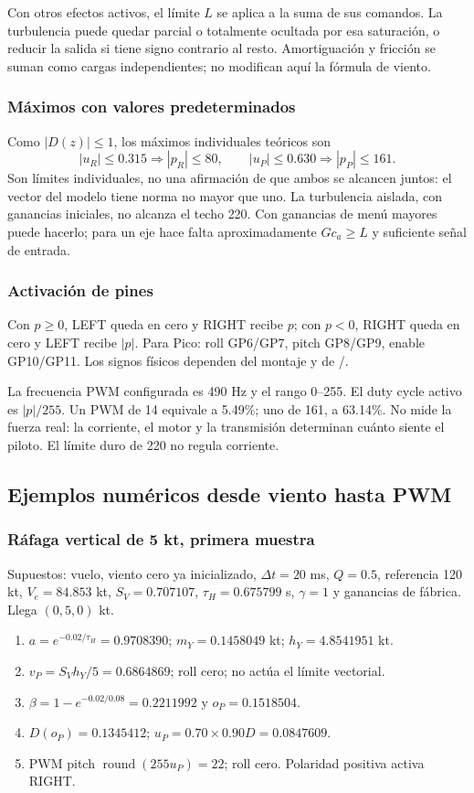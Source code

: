 Con otros efectos activos, el límite $L$ se aplica a la suma de sus comandos. La turbulencia puede quedar parcial o totalmente ocultada por esa saturación, o reducir la salida si tiene signo contrario al resto. Amortiguación y fricción se suman como cargas independientes; no modifican aquí la fórmula de viento.

\subsubsection{Máximos con valores predeterminados}
Como $|D(z)|\le1$, los máximos individuales teóricos son
\begin{equation}
|u_R|\le0.315\Rightarrow |p_R|\le80,\qquad
|u_P|\le0.630\Rightarrow |p_P|\le161.
\end{equation}
Son límites individuales, no una afirmación de que ambos se alcancen juntos: el vector del modelo tiene norma no mayor que uno. La turbulencia aislada, con ganancias iniciales, no alcanza el techo 220. Con ganancias de menú mayores puede hacerlo; para un eje hace falta aproximadamente $G c_a\ge L$ y suficiente señal de entrada.

\subsubsection{Activación de pines}
Con $p\ge0$, LEFT queda en cero y RIGHT recibe $p$; con $p<0$, RIGHT queda en cero y LEFT recibe $|p|$. Para Pico: roll GP6/GP7, pitch GP8/GP9, enable GP10/GP11. Los signos físicos dependen del montaje y de /.

La frecuencia PWM configurada es 490 Hz y el rango 0--255. El duty cycle activo es $|p|/255$. Un PWM de 14 equivale a 5.49\%; uno de 161, a 63.14\%. No mide la fuerza real: la corriente, el motor y la transmisión determinan cuánto siente el piloto. El límite duro de 220 no regula corriente.

\subsection{Ejemplos numéricos desde viento hasta PWM}
\subsubsection{Ráfaga vertical de 5 kt, primera muestra}
Supuestos: vuelo, viento cero ya inicializado, $\Delta t=20$ ms, $Q=0.5$, referencia 120 kt, $V_e=84.853$ kt, $S_V=0.707107$, $\tau_H=0.675799$ s, $\gamma=1$ y ganancias de fábrica. Llega $(0,5,0)$ kt.
\begin{enumerate}
\item $a=e^{-0.02/\tau_H}=0.9708390$; $m_Y=0.1458049$ kt; $h_Y=4.8541951$ kt.
\item $v_P=S_V h_Y/5=0.6864869$; roll cero; no actúa el límite vectorial.
\item $\beta=1-e^{-0.02/0.08}=0.2211992$ y $o_P=0.1518504$.
\item $D(o_P)=0.1345412$; $u_P=0.70\times0.90D=0.0847609$.
\item PWM pitch $\operatorname{round}(255u_P)=22$; roll cero. Polaridad positiva activa RIGHT.
\end{enumerate}

